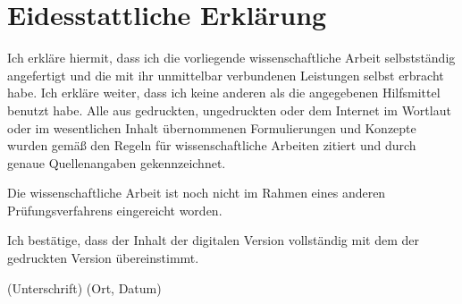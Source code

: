 \chapter*{Eidesstattliche Erklärung}
Ich erkläre hiermit, dass ich die vorliegende wissenschaftliche Arbeit selbstständig angefertigt und die mit ihr unmittelbar verbundenen Leistungen selbst erbracht habe. Ich erkläre weiter, dass ich keine anderen als die angegebenen Hilfsmittel benutzt habe. Alle aus gedruckten, ungedruckten oder dem Internet im Wortlaut oder im wesentlichen Inhalt übernommenen Formulierungen und Konzepte wurden gemäß den Regeln für wissenschaftliche Arbeiten zitiert und durch genaue Quellenangaben gekennzeichnet.
\par 
Die wissenschaftliche Arbeit ist noch nicht im Rahmen eines anderen Prüfungsverfahrens eingereicht
worden.
\par 
Ich bestätige, dass der Inhalt der digitalen Version vollständig mit dem der gedruckten Version übereinstimmt. \par
\vspace{3cm}
(Unterschrift) (Ort, Datum) 